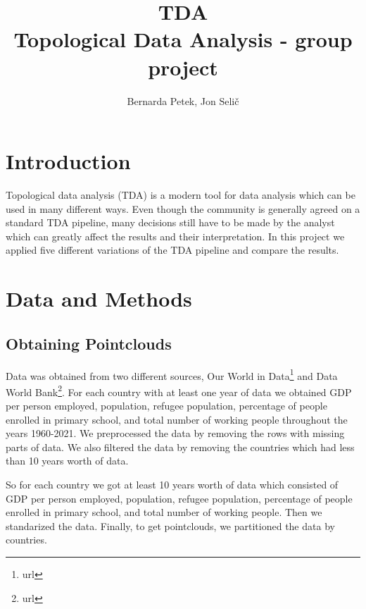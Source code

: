 \documentclass[12pt]{article}
\begin{document}
	
	
	
	
	\title{TDA \\   \large  Topological Data Analysis - group project}
	\author{%
		Bernarda Petek, Jon Selič} %
	
	\date{}
	\maketitle
	
	
	
\section{Introduction}
Topological data analysis (TDA) is a modern tool for data analysis which can be used in many different ways. Even though the community is generally agreed on a standard TDA pipeline, many decisions still have to be made by the analyst which can greatly affect the results and their interpretation. In this project we applied five different variations of the TDA pipeline and compare the results.
\section{Data and Methods}
\subsection{Obtaining Pointclouds}
Data was obtained from two different sources, Our World in Data\footnote{url} and Data World Bank\footnote{url}. For each country with at least one year of data we obtained GDP per person employed, population, refugee population, percentage of people enrolled in primary school, and total number of working people throughout the years 1960-2021. We preprocessed the data by removing the rows with missing parts of data. We also filtered the data by removing the countries which had less than 10 years worth of data. 

So for each country we got at least 10 years worth of data which consisted of GDP per person employed, population, refugee population, percentage of people enrolled in primary school, and total number of working people. Then we standarized the data. Finally, to get pointclouds, we partitioned the data by countries. 
\end{document}
